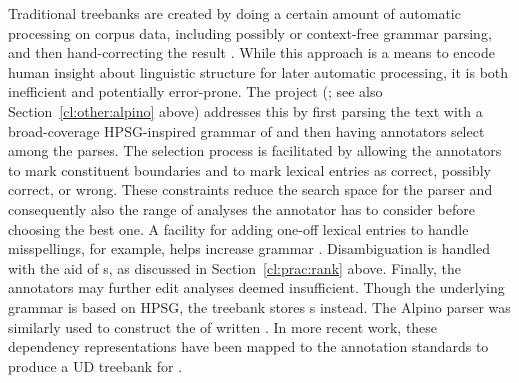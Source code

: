 \documentclass[output=paper,biblatex,babelshorthands,newtxmath,draftmode,colorlinks,citecolor=brown]{langscibook}
\begin{document}
Traditional treebanks are created by doing a certain amount of automatic processing on corpus data,
including possibly  or context-free grammar parsing,
and then hand-correcting the result \citep{Mar:San:Mar:93,Ban:Bon:Cai:13}.  While this approach is a
means to encode human insight about linguistic structure for later automatic processing, it is both
inefficient and potentially error-prone. The  project (\citealt{vanderbeek2002alpino};
see also Section~\ref{cl:other:alpino} above) addresses this by first parsing the text with a
broad-coverage HPSG-inspired grammar of  and then having annotators select
among the parses.  The selection process is facilitated by allowing the annotators to mark
constituent boundaries and to mark lexical entries as
correct, possibly correct, or wrong.  These constraints reduce the search space for the parser and
consequently also the range of analyses the annotator has to consider before choosing the best
one. A facility for adding one-off lexical entries to handle misspellings, for example, helps
increase grammar .  Disambiguation is handled with
the aid of s, as discussed in Section~\ref{cl:prac:rank} above. Finally, the
annotators may further edit analyses deemed insufficient. Though the underlying grammar is based on
HPSG, the treebank stores s instead.  The Alpino parser was similarly used to
construct the  of written  \citep{van:bou:van:13}.  In more recent
work, these dependency representations have been mapped to the 
annotation standards \citep{Niv:Mar:Gin:16} to produce a UD treebank for 
\citep{Bou:Van:17}.
\end{document}
